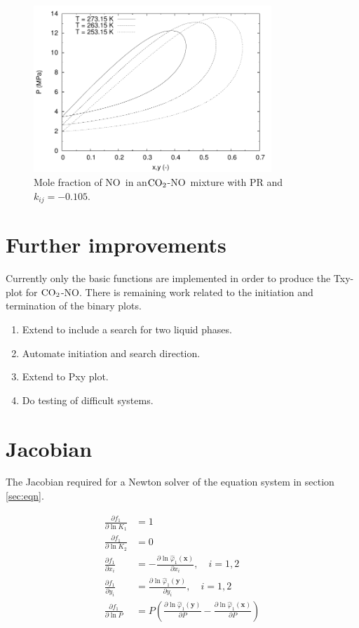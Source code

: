 \documentclass[english]{sintefmemo2012}
\newcommand*{\pd}[2]{\ensuremath{\frac{\partial #1}{\partial{#2}}}}
\newcommand{\coto}{\ensuremath{\text{CO}_{\text{\scriptsize 2}}}}
\newcommand{\no}{\ensuremath{\text{NO}}}
\begin{document}
\begin{figure}[tbp]
  \centering
  \includegraphics[width=0.8\textwidth]{NO_PR_Txy.pdf}
  \caption{Mole fraction of \no~in an\coto-\no~mixture with PR and $k_{ij}=-0.105$.}
  \label{fig:pr_opt}
\end{figure}

\section{Further improvements}
Currently only the basic functions are implemented in order to produce
the Txy-plot for \coto-\no. There is remaining work related to the initiation and termination of the binary plots. 
\begin{enumerate}
\item Extend to include a search for two liquid phases.
\item Automate initiation and search direction.
\item Extend to Pxy plot.
\item Do testing of difficult systems.
\end{enumerate}

\appendix

\section{Jacobian}
The Jacobian required for a Newton solver of the equation system in
section \ref{sec:eqn}.

\begin{align}
 \pd{f_1}{\ln K_1}  & = 1 \\
 \pd{f_1}{\ln K_2}  & = 0 \\
 \pd{f_1}{x_i}  & =  - \pd{\ln
 \hat{\varphi}_1\left(\mathbf{x}\right)}{x_i}, \quad
 i=1,2\\
 \pd{f_1}{y_i}  & =  \pd{\ln
 \hat{\varphi}_1\left(\mathbf{y}\right)}{y_i}, \quad
 i=1,2\\
 \pd{f_1}{\ln P}  & =  P\left(\pd{\ln
 \hat{\varphi}_1\left(\mathbf{y}\right)}{P} -\pd{\ln
 \hat{\varphi}_1\left(\mathbf{x}\right)}{P}\right)
\end{align}
\end{document}
